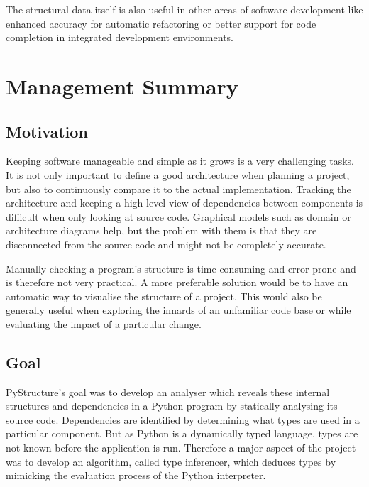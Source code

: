 \documentclass[12pt,halfparskip,DIV11,BCOR10mm]{scrreprt}
\begin{document}
The structural data itself is also useful in other areas of software development like enhanced accuracy for automatic refactoring or better support for code completion in integrated development environments.



\chapter*{Management Summary}

\section*{Motivation}

Keeping software manageable and simple as it grows is a very challenging tasks. 
It is not only important to define a good architecture when planning a project, but also to continuously compare it to the actual implementation. Tracking the architecture and keeping a high-level view of dependencies between components is difficult when only looking at source code. Graphical models such as domain or architecture diagrams help, but the problem with them is that they are disconnected from the source code and might not be completely accurate.

Manually checking a program's structure is time consuming and error prone and is therefore not very practical. A more preferable solution would be to have an automatic way to visualise the structure of a project. This would also be generally useful when exploring the innards of an unfamiliar code base or while evaluating the impact of a particular change.

\section*{Goal}

PyStructure's goal was to develop an analyser which reveals these internal structures and dependencies in a Python program by statically analysing its source code. Dependencies are identified by determining what types are used in a particular component. But as Python is a dynamically typed language, types are not known before the application is run. Therefore a major aspect of the project was to develop an algorithm, called type inferencer, which deduces types by mimicking the evaluation process of the Python interpreter.
\end{document}
